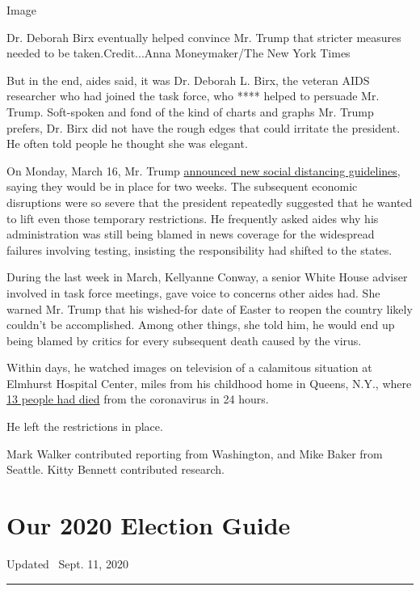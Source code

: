 Image

Dr. Deborah Birx eventually helped convince Mr. Trump that stricter
measures needed to be taken.Credit...Anna Moneymaker/The New York Times

But in the end, aides said, it was Dr. Deborah L. Birx, the veteran AIDS
researcher who had joined the task force, who **** helped to persuade
Mr. Trump. Soft-spoken and fond of the kind of charts and graphs Mr.
Trump prefers, Dr. Birx did not have the rough edges that could irritate
the president. He often told people he thought she was elegant.

On Monday, March 16, Mr. Trump
\href{https://www.nytimes3xbfgragh.onion/2020/03/16/us/politics/trump-coronavirus-guidelines.html}{announced
new social distancing guidelines}, saying they would be in place for two
weeks. The subsequent economic disruptions were so severe that the
president repeatedly suggested that he wanted to lift even those
temporary restrictions. He frequently asked aides why his administration
was still being blamed in news coverage for the widespread failures
involving testing, insisting the responsibility had shifted to the
states.

During the last week in March, Kellyanne Conway, a senior White House
adviser involved in task force meetings, gave voice to concerns other
aides had. She warned Mr. Trump that his wished-for date of Easter to
reopen the country likely couldn't be accomplished. Among other things,
she told him, he would end up being blamed by critics for every
subsequent death caused by the virus.

Within days, he watched images on television of a calamitous situation
at Elmhurst Hospital Center, miles from his childhood home in Queens,
N.Y., where
\href{https://www.nytimes3xbfgragh.onion/2020/03/25/nyregion/nyc-coronavirus-hospitals.html}{13
people had died} from the coronavirus in 24 hours.

He left the restrictions in place.

Mark Walker contributed reporting from Washington, and Mike Baker from
Seattle. Kitty Bennett contributed research.

\hypertarget{our-2020-election-guide}{%
\section{Our 2020 Election Guide}\label{our-2020-election-guide}}

Updated ~Sept. 11, 2020

\begin{center}\rule{0.5\linewidth}{\linethickness}\end{center}

